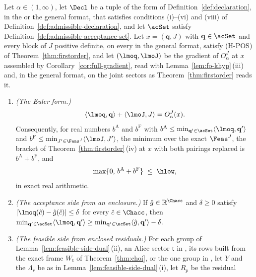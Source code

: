 \begin{lemma}\label{lem:certified-bracket}
Let $\alpha\in(1,\infty)$, let $\Decl$ be a tuple of the form of
Definition~\ref{def:declaration}, in the  or the general
format, that satisfies conditions (i)--(vi) and (viii) of
Definition~\ref{def:admissible-declaration}, and let $\acSet$ satisfy
Definition~\ref{def:admissible-acceptance-set}. Let $x=(\mathbf q,J)$ with
$\mathbf q\in\acSet$ and every block of $J$ positive definite, on every
 in the general format, satisfy (H-POS) of
Theorem~\ref{thm:firstorder}, and let $(\lmoq,\lmoJ)$ be the gradient of
$O^{J}_{\alpha}$ at $x$ assembled by Corollary~\ref{cor:full-gradient},
read with Lemma~\ref{lem:fo-khyp}\,(iii) and, in the general format, on the
joint sectors as Theorem~\ref{thm:firstorder} reads it.
\begin{enumerate}[label=(\roman*),leftmargin=2.4em]
\item \emph{(The Euler form.)}
  \begin{equation}\label{eq:euler-form}
    \langle\lmoq,\mathbf q\rangle+\langle\lmoJ,J\rangle=O^{J}_{\alpha}(x).
  \end{equation}
  Consequently, for real numbers $b^{\mathrm A}$ and $b^{\mathrm F}$ with
  $b^{\mathrm A}\le\min_{\mathbf q'\in\acSet}\langle\lmoq,\mathbf q'\rangle$
  and $b^{\mathrm F}\le\min_{J'\in\Feas^{J}}\langle\lmoJ,J'\rangle$, the
  minimum over the exact $\Feas^{J}$, the bracket of
  Theorem~\ref{thm:firstorder}\,(iv) at $x$ with both pairings replaced is
  $b^{\mathrm A}+b^{\mathrm F}$, and
  \begin{equation}\label{eq:certified-bracket}
    \max\{0,\,b^{\mathrm A}+b^{\mathrm F}\}\;\le\;\hlow ,
  \end{equation}
  in exact real arithmetic.
\item \emph{(The acceptance side from an enclosure.)} If
  $\hat g\in\mathbb{R}^{\Chacc}$ and $\delta\ge0$ satisfy
  $|\lmoq(\hat c)-\hat g(\hat c)|\le\delta$ for every $\hat c\in\Chacc$, then
  $\min_{\mathbf q'\in\acSet}\langle\lmoq,\mathbf q'\rangle\ge
  \min_{\mathbf q'\in\acSet}\langle\hat g,\mathbf q'\rangle-\delta$.
\item \emph{(The feasible side from enclosed residuals.)} For each group of
  Lemma~\ref{lem:feasible-side-dual}\,(ii), an Alice sector $\mathsf t$ in
  , its rows built from the exact frame
  $W_{\mathsf t}$ of Theorem~\ref{thm:choi}, or the one group in
  , let $Y$ and the $\Lambda_r$ be as in
  Lemma~\ref{lem:feasible-side-dual}\,(i), let $R_p$ be the residual

\end{enumerate}
\end{lemma}
